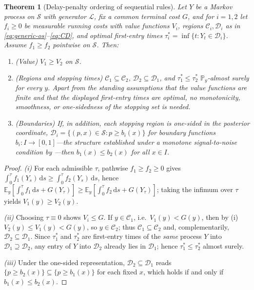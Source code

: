 \documentclass[pdflatex,sn-mathphys-num]{sn-jnl}
\theoremstyle{plain}
\newtheorem{theorem}{Theorem}
\theoremstyle{definition}
\newcommand{\E}{\mathbb{E}}
\newcommand{\PR}{\mathbb{P}}
\newcommand{\Lgen}{\mathscr{L}}
\newcommand{\dd}{\,\mathrm{d}}
\begin{document}
\begin{theorem}[Delay-penalty ordering of sequential rules]\label{thm:comparison}
Let $Y$ be a Markov process on $\mathcal S$ with generator $\Lgen$, fix a common
terminal cost $G$, and for $i=1,2$ let $f_i\ge0$ be measurable running costs with
value functions $V_i$, regions $\mathcal C_i,\mathcal D_i$ as in
\eqref{eq:generic-os}--\eqref{eq:CD}, and optimal first-entry times
$\tau_i^\ast=\inf\{t:Y_t\in\mathcal D_i\}$. Assume $f_1\ge f_2$ pointwise on
$\mathcal S$. Then:
\begin{enumerate}[label=\emph{(\roman*)}]
\item \emph{(Value)} $V_1\ge V_2$ on $\mathcal S$.
\item \emph{(Regions and stopping times)}
$\mathcal C_1\subseteq\mathcal C_2$, $\mathcal D_2\subseteq\mathcal D_1$, and
$\tau_1^\ast\le\tau_2^\ast$ $\PR_y$-almost surely for every $y$. Apart from the
standing assumptions that the value functions are finite and that the displayed
first-entry times are optimal, no monotonicity, smoothness, or one-sidedness of
the stopping set is needed.
\item \emph{(Boundaries)} If, in addition, each stopping region is one-sided in
the posterior coordinate,
$\mathcal D_i=\{(p,x)\in\mathcal S:p\ge b_i(x)\}$ for boundary functions
$b_i:I\to[0,1]$---the structure established under a monotone signal-to-noise
condition by \citet{gapeev2011sequential,gapeev2013bayesian,ernst2024gapeev}---then
$b_1(x)\le b_2(x)$ for all $x\in I$.
\end{enumerate}
\end{theorem}

\begin{proof}
\emph{(i)} For each admissible $\tau$, pathwise $f_1\ge f_2\ge0$ gives
$\int_0^\tau f_1(Y_s)\dd s\ge\int_0^\tau f_2(Y_s)\dd s$, hence
$\E_y[\int_0^\tau f_1\dd s+G(Y_\tau)]\ge\E_y[\int_0^\tau f_2\dd s+G(Y_\tau)]$;
taking the infimum over $\tau$ yields $V_1(y)\ge V_2(y)$.

\emph{(ii)} Choosing $\tau\equiv0$ shows $V_i\le G$. If $y\in\mathcal C_1$, i.e.\
$V_1(y)<G(y)$, then by (i) $V_2(y)\le V_1(y)<G(y)$, so $y\in\mathcal C_2$; thus
$\mathcal C_1\subseteq\mathcal C_2$ and, complementarily,
$\mathcal D_2\subseteq\mathcal D_1$. Since $\tau_1^\ast$ and $\tau_2^\ast$ are
first-entry times of the \emph{same} process $Y$ into
$\mathcal D_1\supseteq\mathcal D_2$, any entry of $Y$ into $\mathcal D_2$ already
lies in $\mathcal D_1$; hence $\tau_1^\ast\le\tau_2^\ast$ almost surely.

\emph{(iii)} Under the one-sided representation,
$\mathcal D_2\subseteq\mathcal D_1$ reads
$\{p\ge b_2(x)\}\subseteq\{p\ge b_1(x)\}$ for each fixed $x$, which holds if and
only if $b_1(x)\le b_2(x)$.
\end{proof}
\end{document}

